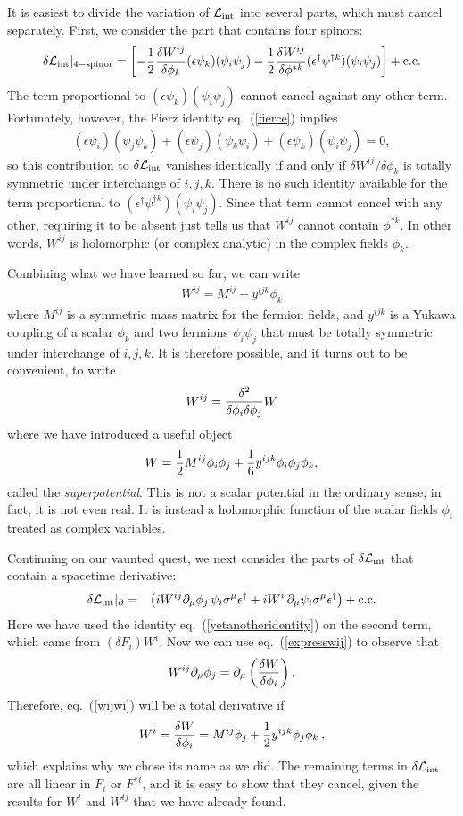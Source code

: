 \documentclass[11pt]{article}
\def\beq{\begin{eqnarray}}
\def\eeq{\end{eqnarray}}
\def\lagr{{\cal L}}
\def\conj{{{\rm c.c.}}}
\begin{document}
It is easiest to divide the variation of $\lagr_{\rm int}$ into several
parts, which must cancel separately. First, we consider the part that
contains four spinors:
\beq
\delta \lagr_{\rm int} |_{\rm 4-spinor} = \left [
-{1\over 2} {\delta W^{ij} \over \delta \phi_k} 
  (\epsilon \psi_k)(\psi_i \psi_j)
-{1\over 2} {\delta W^{ij} \over \delta \phi^{*k}}
  ({\epsilon^\dagger}{\psi}^{\dagger k})(\psi_i \psi_j) \right ]
+ \conj
\label{deltafourferm}
\eeq
The term proportional to $(\epsilon \psi_k)(\psi_i\psi_j)$ cannot cancel
against any other term. Fortunately, however, the Fierz identity
eq.~(\ref{fierce}) implies
\beq
(\epsilon \psi_i) (\psi_j \psi_k) + (\epsilon \psi_j) (\psi_k \psi_i)
+ (\epsilon \psi_k) (\psi_i\psi_j) = 0 ,
\eeq
so this contribution to $\delta\lagr_{\rm int}$ vanishes identically if
and only if $\delta W^{ij}/\delta \phi_k$ is totally symmetric under
interchange of $i,j,k$. There is no such identity available for the term
proportional to $({\epsilon^\dagger } {\psi}^{\dagger k})(\psi_i\psi_j)$.
Since that term cannot cancel with any other, requiring it to be absent
just tells us that $W^{ij}$ cannot contain $\phi^{*k}$. In other words,
$W^{ij}$ is holomorphic (or complex analytic) in the complex fields $\phi_k$.

Combining what we have learned  so far, we can write
\beq
W^{ij} = M^{ij} + y^{ijk} \phi_k
\eeq
where $M^{ij}$ is a symmetric mass matrix for the fermion fields, and
$y^{ijk}$ is a Yukawa coupling of a scalar $\phi_k$ and two fermions
$\psi_i \psi_j$ that must be totally symmetric under interchange of
$i,j,k$. It is therefore possible, and it turns out to be convenient, to
write
\beq
W^{ij} = {\delta^2 \over \delta\phi_i\delta\phi_j} W
\label{expresswij}
\eeq
where we have introduced a useful object
\beq
W =
{1\over 2} M^{ij} \phi_i \phi_j + {1\over 6} y^{ijk} \phi_i \phi_j \phi_k,
\label{superpotential}
\eeq
called the {\it superpotential}. This is not a
scalar potential in the ordinary sense; in fact, it is not even real. It
is instead a holomorphic function of the scalar fields $\phi_i$ treated as
complex variables. 

Continuing on our vaunted quest, we next consider the parts of 
$\delta \lagr_{\rm int}$ that contain a spacetime derivative: 
\beq
\delta \lagr_{\rm int} |_\partial &=& \left (
 i W^{ij}\partial_\mu \phi_j \, \psi_i \sigma^\mu {\epsilon^\dagger}
+ i W^i\, \partial_\mu \psi_i\sigma^\mu {\epsilon^\dagger}
\right ) +\conj
\label{wijwi}
\eeq
Here we have used the identity eq.~(\ref{yetanotheridentity}) on the
second term, which came from $(\delta F_i)W^i$. Now we can use
eq.~(\ref{expresswij}) to observe that
\beq
W^{ij} \partial_\mu \phi_j =
\partial_\mu \left ( {\delta W\over \delta{\phi_i}}\right ) .
\label{parttwo}
\eeq
Therefore, eq.~(\ref{wijwi}) will be a total derivative if
\beq
W^i = {\delta W\over \delta \phi_i} 
= M^{ij}\phi_j + {1\over 2} y^{ijk} \phi_j \phi_k\> ,
\label{wiwiwi}
\eeq
which explains why we chose its name as we did. The remaining terms in
$\delta \lagr_{\rm int}$ are all linear in $F_i$ or $F^{*i}$, and it is
easy to show that they cancel, given the results for $W^i$ and $W^{ij}$
that we have already found. 
\end{document}
